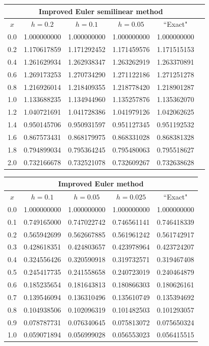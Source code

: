 \documentclass[dvips]{book}
\renewcommand{\exer}[1]{\par\medskip\;\noindent{\color{red}\bf #1.}}
\numberwithin{example}{section}
\numberwithin{equation}{section}
\numberwithin{theorem}{section}
\numberwithin{table}{section}
\numberwithin{figure}{section}
\begin{document}
{\small
\begin{tabular}{|c|r|r|r|r|r|}
\hline
\multicolumn{5}{|c|}{
Improved Euler semilinear method}\\\hline
\multicolumn{1}{|c|}{$x$}&
\multicolumn{1}{|c|}{$h=0.2$}&
\multicolumn{1}{|c|}{$h=0.1$}&
\multicolumn{1}{|c|}{$h=0.05$}&
\multicolumn{1}{|c|}{``Exact"}\\ \hline
0.0 & 1.000000000 & 1.000000000 & 1.000000000 & 1.000000000 \\
0.2 & 1.170617859 & 1.171292452 & 1.171459576 & 1.171515153 \\
0.4 & 1.261629934 & 1.262938347 & 1.263262919 & 1.263370891 \\
0.6 & 1.269173253 & 1.270734290 & 1.271122186 & 1.271251278 \\
0.8 & 1.216926014 & 1.218409355 & 1.218778420 & 1.218901287 \\
1.0 & 1.133688235 & 1.134944960 & 1.135257876 & 1.135362070 \\
1.2 & 1.040721691 & 1.041728386 & 1.041979126 & 1.042062625 \\
1.4 & 0.950145706 & 0.950931597 & 0.951127345 & 0.951192532 \\
1.6 & 0.867573431 & 0.868179975 & 0.868331028 & 0.868381328 \\
1.8 & 0.794899034 & 0.795364245 & 0.795480063 & 0.795518627 \\
2.0 & 0.732166678 & 0.732521078 & 0.732609267 & 0.732638628 \\
\hline
\end{tabular}}

\exer{3.2.20}
{\small
\begin{tabular}{|c|r|r|r|r|}
\hline
\multicolumn{5}{|c|}{Improved Euler method}\\\hline
\multicolumn{1}{|c|}{$x$}&
\multicolumn{1}{|c|}{$h=0.1$}&
\multicolumn{1}{|c|}{$h=0.05$}&
\multicolumn{1}{|c|}{$h=0.025$}&
\multicolumn{1}{|c|}{``Exact"}\\ \hline
0.0 & 1.000000000 & 1.000000000 & 1.000000000 & 1.000000000 \\
0.1 & 0.749165000 & 0.747022742 & 0.746561141 & 0.746418339 \\
0.2 & 0.565942699 & 0.562667885 & 0.561961242 & 0.561742917 \\
0.3 & 0.428618351 & 0.424803657 & 0.423978964 & 0.423724207 \\
0.4 & 0.324556426 & 0.320590918 & 0.319732571 & 0.319467408 \\
0.5 & 0.245417735 & 0.241558658 & 0.240723019 & 0.240464879 \\
0.6 & 0.185235654 & 0.181643813 & 0.180866303 & 0.180626161 \\
0.7 & 0.139546094 & 0.136310496 & 0.135610749 & 0.135394692 \\
0.8 & 0.104938506 & 0.102096319 & 0.101482503 & 0.101293057 \\
0.9 & 0.078787731 & 0.076340645 & 0.075813072 & 0.075650324 \\
1.0 & 0.059071894 & 0.056999028 & 0.056553023 & 0.056415515 \\
\hline
\end{tabular}}
\medskip
\end{document}
